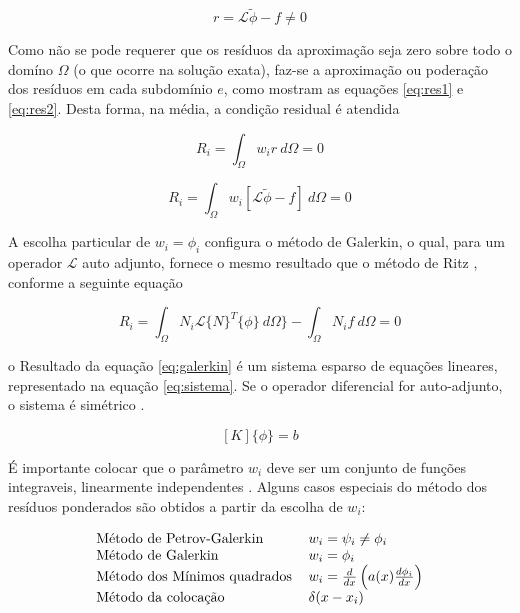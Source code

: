 \documentclass[
    12pt,               %
    openright,          %
    oneside,
    a4paper,            %
    english,            %
    french,             %
    spanish,            %
    brazil              %
    ]{abntex2}
\begin{document}
  \begin{equation}
    \label{eq:residuos}
    r = \mathcal{L} \tilde{\phi} - f \neq 0
  \end{equation}

Como não se pode requerer que os resíduos da aproximação seja zero sobre todo o domíno $\Omega$ (o que ocorre na solução exata), faz-se a aproximação ou poderação dos resíduos em cada subdomínio $e$, como mostram as equações \ref{eq:res1} e \ref{eq:res2}. Desta forma, na média, a condição residual é atendida \cite[p. 28]{volakis}

  \begin{equation}
    \label{eq:res1}
    R_i = \int_{\Omega}{w_i r \ d\Omega} = 0
  \end{equation}
  
  \begin{equation}
    \label{eq:res2}
    R_i = \int_{\Omega}{w_i [\mathcal{L} \tilde{\phi} - f] \ d\Omega} = 0
  \end{equation}  


A escolha particular de $w_i = \phi_i$ configura o método de Galerkin, o qual, para um operador $\mathcal{L}$ auto adjunto, fornece o mesmo resultado que o método de Ritz  \cite[p. 22]{jin}, conforme a seguinte equação

  \begin{equation}
    \label{eq:galerkin}
    R_i = 
    \int_{\Omega}{N_i \mathcal{L} \{N\}^T \{\phi\} \ d\Omega\}} - \int_{\Omega}{N_i f \ d \Omega} = 0
  \end{equation}  
  
  
  o Resultado da equação \ref{eq:galerkin} é um sistema esparso de equações lineares, representado na equação \ref{eq:sistema}. Se o operador diferencial for auto-adjunto, o sistema é simétrico \cite[p. 36]{volakis}.
  
    \begin{equation}
        \label{eq:sistema}
        [K]\{\phi\} = {b}
    \end{equation}  

É importante colocar que o parâmetro $w_i$ deve ser um conjunto de funções integraveis, linearmente independentes
\cite[p. 60]{reddy}. Alguns casos especiais do método dos resíduos ponderados são obtidos a partir da escolha de $w_i$:

\begin{equation}
\label{eq:metPond}
    \begin{tabular}{ l l }
    Método de Petrov-Galerkin & $ w_i = \psi_i \neq \phi_i $ \\ 
    Método de Galerkin & $ w_i = \phi_i $\\  
    Método dos Mínimos quadrados & $ w_i = \frac{d}{dx} \left(a(x)\frac{d \phi_i}{dx}\right) $ \\ 
    Método da colocação & $ \delta(x - x_i)  $ 
    \end{tabular}
\end{equation}
\end{document}
